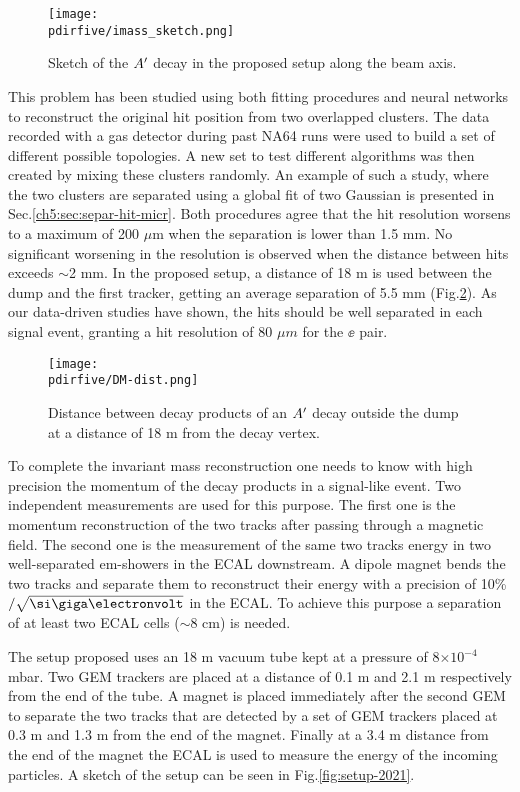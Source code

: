 \begin{figure}[bth!]
  \centering
  \texttt{[image: \\pdirfive/imass\_sketch.png]}
  \caption[Invariant mass reconstruction sketch]{Sketch of the $A'$ decay in the proposed setup along the beam axis.}
  \label{fig:imass_sketch}
\end{figure}


This problem has been studied using both fitting procedures and neural networks to reconstruct the original hit position from two overlapped clusters. The data recorded with a gas detector during past NA64 runs were used to build a set of different possible topologies. A new set to test different algorithms was then created by mixing these clusters randomly. An example of such a study, where the two clusters are separated using a global fit of two Gaussian is presented in Sec.\ref{ch5:sec:separ-hit-micr}. Both procedures agree that the hit resolution worsens to a maximum of 200 $\mu$m when the separation is lower than 1.5 mm. No significant worsening in the resolution is observed when the distance between hits exceeds $\sim$2 mm. In the proposed setup, a distance of 18 m is used between the dump and the first tracker, getting an average separation of 5.5 mm (Fig.\ref{fig:dm_dist1}). As our data-driven studies have shown, the hits should be well separated in each signal event, granting a hit resolution of 80 $\mu m$ for the $\ee$ pair.

\begin{figure}[tbh!]
  \centering
  \texttt{[image: \\pdirfive/DM-dist.png]}
  \caption[Distance of the decay products of X17 in the 2021 setup]{Distance between decay products of an $A'$ decay outside the dump at a distance of 18 m from the decay vertex.}
  \label{fig:dm_dist1}
\end{figure}

To complete the invariant mass reconstruction one needs to know with high precision the momentum of the decay products in a signal-like event. Two independent measurements are used for this purpose. The first one is the momentum reconstruction of the two tracks after passing through a magnetic field. The second one is the measurement of the same two tracks energy in two well-separated em-showers in the ECAL downstream. A dipole magnet bends the two tracks and separate them to reconstruct their energy with a precision of 10\%$/\sqrt{\gev}$ in the ECAL. To achieve this purpose a separation of at least two ECAL cells ($\sim 8$ cm) is needed.

The setup proposed uses an 18 m vacuum tube kept at a pressure of 8$\times 10^{-4}$ mbar. Two GEM trackers \cite{gem} are placed at a distance of 0.1 m and 2.1 m respectively from the end of the tube. A magnet is placed immediately after the second GEM to separate the two tracks that are detected by a set of GEM trackers placed at 0.3 m and 1.3 m from the end of the magnet. Finally at a 3.4 m distance from the end of the magnet the ECAL is used to measure the energy of the incoming particles. A sketch of the setup can be seen in Fig.\ref{fig:setup-2021}.

